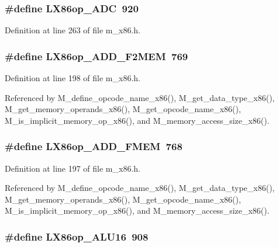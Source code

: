 \subsubsection{\setlength{\rightskip}{0pt plus 5cm}\#define LX86op\_\-ADC~920}\label{m__x86_8h_56d792b69aaad41ac598832f0cb4cbe7}




Definition at line 263 of file m\_\-x86.h.
\subsubsection{\setlength{\rightskip}{0pt plus 5cm}\#define LX86op\_\-ADD\_\-F2MEM~769}\label{m__x86_8h_4dcf80e741fcea68ec45f5689f40b497}




Definition at line 198 of file m\_\-x86.h.

Referenced by M\_\-define\_\-opcode\_\-name\_\-x86(), M\_\-get\_\-data\_\-type\_\-x86(), M\_\-get\_\-memory\_\-operands\_\-x86(), M\_\-get\_\-opcode\_\-name\_\-x86(), M\_\-is\_\-implicit\_\-memory\_\-op\_\-x86(), and M\_\-memory\_\-access\_\-size\_\-x86().
\subsubsection{\setlength{\rightskip}{0pt plus 5cm}\#define LX86op\_\-ADD\_\-FMEM~768}\label{m__x86_8h_2269f7fa41bd7c3afedbb3d72698039a}




Definition at line 197 of file m\_\-x86.h.

Referenced by M\_\-define\_\-opcode\_\-name\_\-x86(), M\_\-get\_\-data\_\-type\_\-x86(), M\_\-get\_\-memory\_\-operands\_\-x86(), M\_\-get\_\-opcode\_\-name\_\-x86(), M\_\-is\_\-implicit\_\-memory\_\-op\_\-x86(), and M\_\-memory\_\-access\_\-size\_\-x86().
\subsubsection{\setlength{\rightskip}{0pt plus 5cm}\#define LX86op\_\-ALU16~908}\label{m__x86_8h_32592ce27ea1e941960d909cc757a37b}




